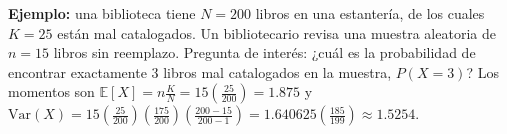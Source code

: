 \begin{solproblema}[prob:969b25a]
	\textbf{Ejemplo:} una biblioteca tiene $N=200$ libros en una estantería, de los cuales $K=25$ están mal catalogados. Un bibliotecario revisa una muestra aleatoria de $n=15$ libros sin reemplazo. Pregunta de interés: ¿cuál es la probabilidad de encontrar exactamente $3$ libros mal catalogados en la muestra, $P(X=3)$? Los momentos son $\mathbb{E}[X] = n\frac{K}{N} = 15\left(\frac{25}{200}\right) = 1.875$ y $\text{Var}(X) = 15\left(\frac{25}{200}\right)\left(\frac{175}{200}\right)\left(\frac{200-15}{200-1}\right) = 1.640625\left(\frac{185}{199}\right) \approx 1.5254$.
\end{solproblema}
